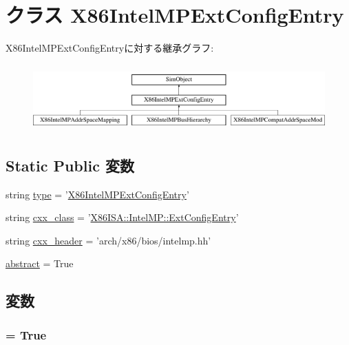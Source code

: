 \hypertarget{classIntelMP_1_1X86IntelMPExtConfigEntry}{
\section{クラス X86IntelMPExtConfigEntry}
\label{classIntelMP_1_1X86IntelMPExtConfigEntry}
}
X86IntelMPExtConfigEntryに対する継承グラフ:\begin{figure}[H]
\begin{center}
\leavevmode
\includegraphics[height=2.59259cm]{classIntelMP_1_1X86IntelMPExtConfigEntry}
\end{center}
\end{figure}
\subsection*{Static Public 変数}
\begin{DoxyCompactItemize}
\item 
string \hyperlink{classIntelMP_1_1X86IntelMPExtConfigEntry_acce15679d830831b0bbe8ebc2a60b2ca}{type} = '\hyperlink{classIntelMP_1_1X86IntelMPExtConfigEntry}{X86IntelMPExtConfigEntry}'
\item 
string \hyperlink{classIntelMP_1_1X86IntelMPExtConfigEntry_a58cd55cd4023648e138237cfc0822ae3}{cxx\_\-class} = '\hyperlink{classX86ISA_1_1IntelMP_1_1ExtConfigEntry}{X86ISA::IntelMP::ExtConfigEntry}'
\item 
string \hyperlink{classIntelMP_1_1X86IntelMPExtConfigEntry_a17da7064bc5c518791f0c891eff05fda}{cxx\_\-header} = 'arch/x86/bios/intelmp.hh'
\item 
\hyperlink{classIntelMP_1_1X86IntelMPExtConfigEntry_a17fa61ac3806b481cafee5593b55e5d0}{abstract} = True
\end{DoxyCompactItemize}


\subsection{変数}
\hypertarget{classIntelMP_1_1X86IntelMPExtConfigEntry_a17fa61ac3806b481cafee5593b55e5d0}{
\subsubsection[{abstract}]{ = True}}
\label{classIntelMP_1_1X86IntelMPExtConfigEntry_a17fa61ac3806b481cafee5593b55e5d0}



